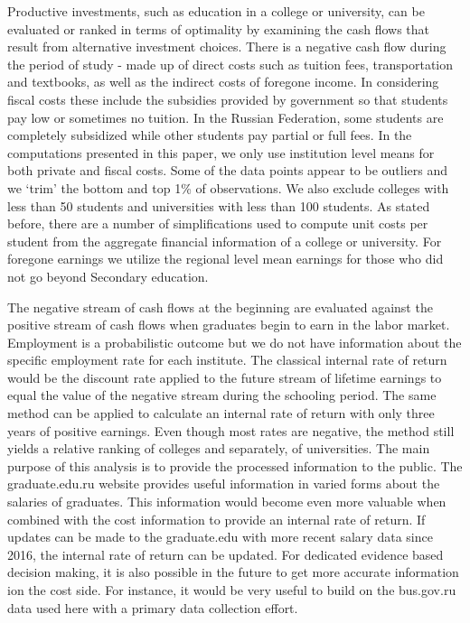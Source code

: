 \documentclass[alpha-refs]{wiley-article-05g}
\begin{document}
Productive investments, such as education in a college or university, can 
be evaluated or ranked in terms of optimality by examining the cash flows 
that result from alternative investment choices. There is a negative cash 
flow during the period of study - made up of direct costs such as tuition 
fees, transportation and textbooks, as well as the indirect costs of 
foregone income. In considering fiscal costs these include the subsidies 
provided by government so that students pay low or sometimes no tuition. In 
the Russian Federation, some students are completely subsidized while other 
students pay partial or full fees. In the computations presented in this 
paper, we only use institution level means for both private and fiscal 
costs. Some of the data points appear to be outliers and we `trim' the 
bottom and top 1\% of observations. We also exclude colleges with less than 
50 students and universities with less than 100 students. As stated before, 
there are a number of simplifications used to compute unit costs per 
student from the aggregate financial information of a college or 
university. For foregone earnings we utilize the regional level mean 
earnings for those who did not go beyond Secondary education. 

The negative stream of cash flows at the beginning are evaluated against the positive stream of cash flows when graduates begin to earn in the labor market. Employment is a probabilistic outcome but we do not have information about the specific employment rate for each institute. The classical internal rate of return would be the discount rate applied to the future stream of lifetime earnings to equal the value of the negative stream during the schooling period. The same method can be applied to calculate an internal rate of return with only three years of positive earnings. Even though most rates are negative, the method still yields a relative ranking of colleges and separately, of universities. The main purpose of this analysis is to provide the processed information to the public. The graduate.edu.ru website provides useful information in varied forms about the salaries of graduates. This information would become even more valuable when combined with the cost information to provide an internal rate of return. If updates can be made to the graduate.edu with more recent salary data since 2016, the internal rate of return can be updated. For dedicated evidence based decision making, it is also possible in the future to get more accurate information ion the cost side. For instance, it would be very useful to build on the bus.gov.ru data used here with a primary data collection effort. 
\end{document}
